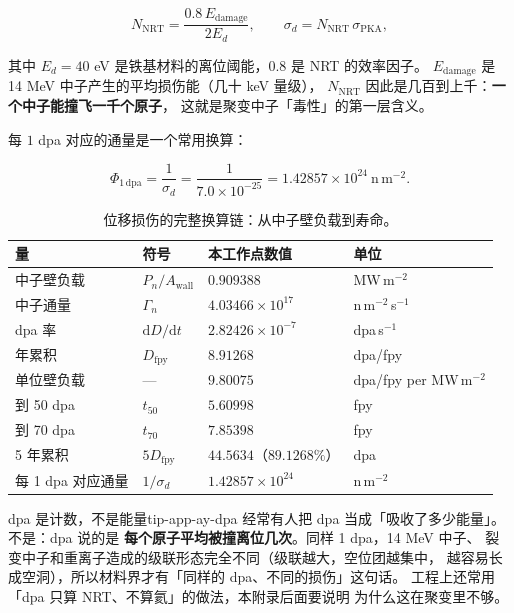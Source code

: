 \begin{equation}
N_\mathrm{NRT}=\frac{0.8\,E_\mathrm{damage}}{2E_d},
\qquad
\sigma_d=N_\mathrm{NRT}\,\sigma_\mathrm{PKA},
\label{eq:app-ay-nrt}
\end{equation}

其中 $E_d=40$ eV 是铁基材料的离位阈能，$0.8$ 是 NRT 的效率因子。
$E_\mathrm{damage}$ 是 14 MeV 中子产生的平均损伤能（几十 keV 量级），
$N_\mathrm{NRT}$ 因此是几百到上千：\textbf{一个中子能撞飞一千个原子}，
这就是聚变中子「毒性」的第一层含义。

每 $1$ dpa 对应的通量是一个常用换算：

\begin{equation}
\Phi_{1\,\mathrm{dpa}}=\frac{1}{\sigma_d}
=\frac{1}{7.0\times10^{-25}}=1.42857\times10^{24}\ \mathrm{n\,m^{-2}}.
\label{eq:app-ay-fluence}
\end{equation}

\begin{table}[htbp]
\centering
\small
\setlength{\tabcolsep}{4pt}
\caption{位移损伤的完整换算链：从中子壁负载到寿命。}
\label{tab:app-ay-dpa}
\begin{tabular}{p{4.4cm}p{3.0cm}p{3.6cm}p{2.4cm}}
\toprule
量 & 符号 & 本工作点数值 & 单位 \\
\midrule
中子壁负载 & $P_n/A_\mathrm{wall}$ & $0.909388$ & MW\,m$^{-2}$ \\
中子通量 & $\Gamma_n$ & $4.03466\times10^{17}$ & n\,m$^{-2}$\,s$^{-1}$ \\
dpa 率 & $\mathrm{d}D/\mathrm{d}t$ & $2.82426\times10^{-7}$ & dpa\,s$^{-1}$ \\
年累积 & $D_\mathrm{fpy}$ & $8.91268$ & dpa/fpy \\
单位壁负载 & --- & $9.80075$ & dpa/fpy per MW\,m$^{-2}$ \\
到 50 dpa & $t_{50}$ & $5.60998$ & fpy \\
到 70 dpa & $t_{70}$ & $7.85398$ & fpy \\
5 年累积 & $5D_\mathrm{fpy}$ & $44.5634$（$89.1268\%$） & dpa \\
每 1 dpa 对应通量 & $1/\sigma_d$ & $1.42857\times10^{24}$ & n\,m$^{-2}$ \\
\bottomrule
\end{tabular}

\end{table}

\begin{tip}{dpa 是计数，不是能量}{tip-app-ay-dpa}
经常有人把 dpa 当成「吸收了多少能量」。不是：dpa 说的是
\textbf{每个原子平均被撞离位几次}。同样 1 dpa，14 MeV 中子、
裂变中子和重离子造成的级联形态完全不同（级联越大，空位团越集中，
越容易长成空洞），所以材料界才有「同样的 dpa、不同的损伤」这句话。
工程上还常用「dpa 只算 NRT、不算氦」的做法，本附录后面要说明
为什么这在聚变里不够。
\end{tip}

